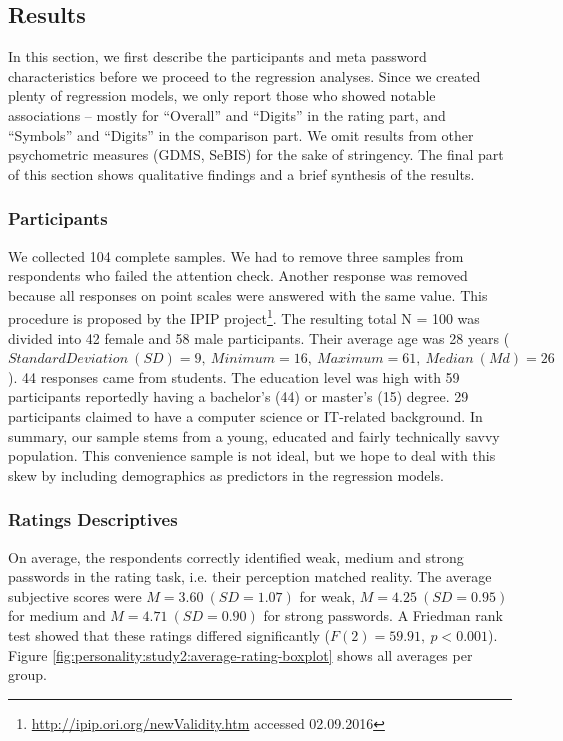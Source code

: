 \subsection{Results}
In this section, we first describe the participants and meta password characteristics before we proceed to the regression analyses. Since we created plenty of regression models, we only report those who showed notable associations -- mostly for ``Overall'' and ``Digits'' in the rating part, and ``Symbols'' and ``Digits'' in the comparison part. We omit results from other psychometric measures (GDMS, SeBIS) for the sake of stringency. The final part of this section shows qualitative findings and a brief synthesis of the results. 

\subsubsection{Participants}
We collected 104 complete samples. We had to remove three samples from respondents who failed the attention check. Another response was removed because all responses on point scales were answered with the same value. This procedure is proposed by the IPIP project\footnote{\url{http://ipip.ori.org/newValidity.htm} accessed 02.09.2016}. The resulting total N = 100 was divided into 42 female and 58 male participants. Their average age was 28 years ($Standard Deviation~(SD) = 9,~Minimum = 16,~Maximum = 61,~Median~(Md) = 26$). 44 responses came from students. The education level was high with 59 participants reportedly having a bachelor's (44) or master's (15) degree. 29 participants claimed to have a computer science or IT-related background. In summary, our sample stems from a young, educated and fairly technically savvy population. This convenience sample is not ideal, but we hope to deal with this skew by including demographics as predictors in the regression models.

\subsubsection{Ratings Descriptives}
On average, the respondents correctly identified weak, medium and strong passwords in the rating task, i.e. their perception matched reality. The average subjective scores were $M=3.60~(SD=1.07)$ for weak, $M=4.25~(SD=0.95)$ for medium and $M=4.71~(SD=0.90)$ for strong passwords. A Friedman rank test showed that these ratings differed significantly ($F(2)=59.91,~p < 0.001$). Figure \ref{fig:personality:study2:average-rating-boxplot} shows all averages per group.

